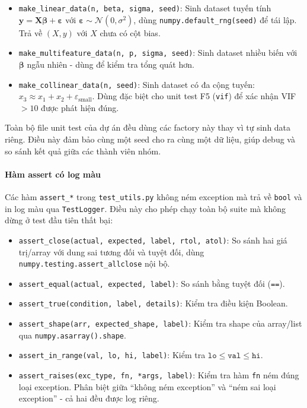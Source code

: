 \begin{itemize}
    \item \texttt{make\_linear\_data(n, beta, sigma, seed)}: Sinh dataset tuyến tính $\mathbf{y} = \mathbf{X}\boldsymbol{\beta} + \boldsymbol{\varepsilon}$ với $\boldsymbol{\varepsilon} \sim \mathcal{N}(0, \sigma^2)$, dùng \texttt{numpy.default\_rng(seed)} để tái lập. Trả về $(X, y)$ với $X$ chưa có cột bias.
    \item \texttt{make\_multifeature\_data(n, p, sigma, seed)}: Sinh dataset nhiều biến với $\boldsymbol{\beta}$ ngẫu nhiên - dùng để kiểm tra tổng quát hơn.
    \item \texttt{make\_collinear\_data(n, seed)}: Sinh dataset có đa cộng tuyến: $x_3 \approx x_1 + x_2 + \varepsilon_{\mathrm{small}}$. Dùng đặc biệt cho unit test F5 (\texttt{vif}) để xác nhận VIF $> 10$ được phát hiện đúng.
\end{itemize}

Toàn bộ file unit test của dự án đều dùng các factory này thay vì tự sinh data riêng. Điều này đảm bảo cùng một seed cho ra cùng một dữ liệu, giúp debug và so sánh kết quả giữa các thành viên nhóm.

\paragraph{Hàm assert có log màu}

Các hàm \texttt{assert\_*} trong \texttt{test\_utils.py} không ném exception mà trả về \texttt{bool} và in log màu qua \texttt{TestLogger}. Điều này cho phép chạy toàn bộ suite mà không dừng ở test đầu tiên thất bại:

\begin{itemize}
    \item \texttt{assert\_close(actual, expected, label, rtol, atol)}: So sánh hai giá trị/array với dung sai tương đối và tuyệt đối, dùng \texttt{numpy.testing.assert\_allclose} nội bộ.
    \item \texttt{assert\_equal(actual, expected, label)}: So sánh bằng tuyệt đối (\texttt{==}).
    \item \texttt{assert\_true(condition, label, details)}: Kiểm tra điều kiện Boolean.
    \item \texttt{assert\_shape(arr, expected\_shape, label)}: Kiểm tra shape của array/list qua \texttt{numpy.asarray().shape}.
    \item \texttt{assert\_in\_range(val, lo, hi, label)}: Kiểm tra $\texttt{lo} \leq \texttt{val} \leq \texttt{hi}$.
    \item \texttt{assert\_raises(exc\_type, fn, *args, label)}: Kiểm tra hàm \texttt{fn} ném đúng loại exception. Phân biệt giữa ``không ném exception'' và ``ném sai loại exception'' - cả hai đều được log riêng.
\end{itemize}

